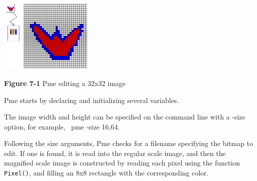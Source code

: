 \begin{center}
\includegraphics[width=1.7917in,height=1.3575in]{ub-img/ub-img11.jpg}
\end{center}

{\sffamily\bfseries Figure 7-1}
{\sffamily Pme editing a 32x32 image}

\bigskip

Pme starts by declaring and initializing several variables.

\bigskip


The image width and height can be specified on the command line with a
{}-size option, for example, \ pme -size 16,64.


Following the size arguments, Pme checks for a filename specifying the
bitmap to edit. If one is found, it is read into the regular scale
image, and then the magnified scale image is constructed by reading
each pixel using the function \texttt{Pixel()}, and filling an 8x8
rectangle with the corresponding color.

